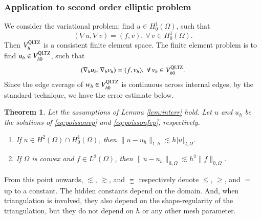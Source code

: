 \documentclass[12pt,showkeys]{amsart}
\newtheorem{theorem}{Theorem}
\begin{document}
\subsubsection{Application to second order elliptic problem}
We consider the variational problem: find $u\in H^1_0(\Omega)$, such that
\begin{equation}\label{eq:poissonvp}
(\nabla u,\nabla v)=(f,v),\ \forall\,v\in H^1_0(\Omega).
\end{equation}
Then $V_h^{\rm QLTZ}$ is a consistent finite element space. The finite element problem is to find $u_h\in V_{h0}^{\rm QLTZ}$, such that
\begin{equation}\label{eq:poissonfep}
(\nabla_hu_h,\nabla_hv_h)=(f,v_h),\ \forall\,v_h\in V_{h0}^{\rm QLTZ}.
\end{equation}
Since the edge average of $w_h\in V_{h0}^{\rm QLTZ}$ is continuous across internal edges, by the standard technique, we have the error estimate below.
\begin{theorem}
Let the assumptions of Lemma \ref{lem:interr} hold. Let $u$ and $u_h$ be the solutions of \eqref{eq:poissonvp} and \eqref{eq:poissonfep}, respectively. 
\begin{enumerate}
\item If $u\in H^2(\Omega)\cap H^1_0(\Omega)$, then $\|u-u_h\|_{1,h}\lesssim h|u|_{2,\Omega}$.
\item If $\Omega$ is convex and $f\in L^2(\Omega)$, then $\|u-u_h\|_{0,\Omega}\lesssim h^2\|f\|_{0,\Omega}$.
\end{enumerate}
\end{theorem}
From this point onwards, $\lesssim$, $\gtrsim$, and ${\raisebox{-1.5mm}{$\;\stackrel{\raisebox{-3.9mm}{=}}{{\sim}}\;$}}$ respectively denote $\leqslant$, $\geqslant$, and $=$ up to a constant. The hidden constants depend on the domain. And, when triangulation is involved, they also depend on the shape-regularity of the triangulation, but they do not depend on $h$ or any other mesh parameter.
\end{document}
